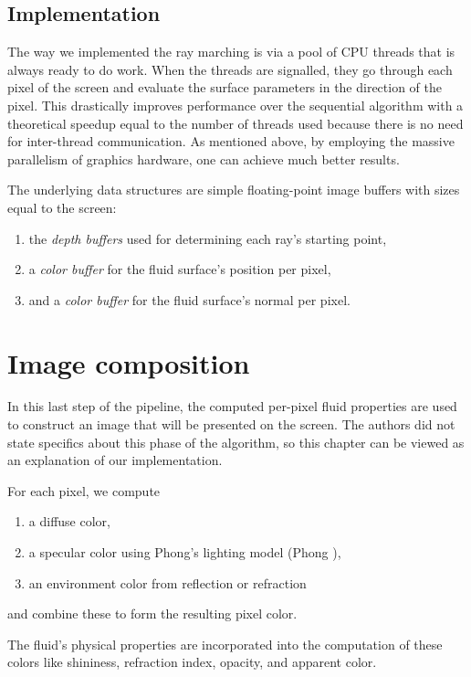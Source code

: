 \subsection{Implementation}

The way we implemented the ray marching is via a pool of CPU threads that is always ready to do work. When the threads are signalled, they go through each pixel of the screen and evaluate the surface parameters in the direction of the pixel. This drastically improves performance over the sequential algorithm with a theoretical speedup equal to the number of threads used because there is no need for inter-thread communication. As mentioned above, by employing the massive parallelism of graphics hardware, one can achieve much better results.

The underlying data structures are simple floating-point image buffers with sizes equal to the screen:
\begin{enumerate}
    \item the \textit{depth buffers} used for determining each ray's starting point,
    \item a \textit{color buffer} for the fluid surface's position per pixel,
    \item and a \textit{color buffer} for the fluid surface's normal per pixel.
\end{enumerate}


\section{Image composition}
\label{sec:imagecomposition}

In this last step of the pipeline, the computed per-pixel fluid properties are used to construct an image that will be presented on the screen. The authors did not state specifics about this phase of the algorithm, so this chapter can be viewed as an explanation of our implementation.

For each pixel, we compute
\begin{enumerate}
    \item a diffuse color,
    \item a specular color using Phong's lighting model (Phong \cite{Phong:1975}),
    \item an environment color from reflection or refraction
\end{enumerate}
and combine these to form the resulting pixel color.

The fluid's physical properties are incorporated into the computation of these colors like shininess, refraction index, opacity, and apparent color.

